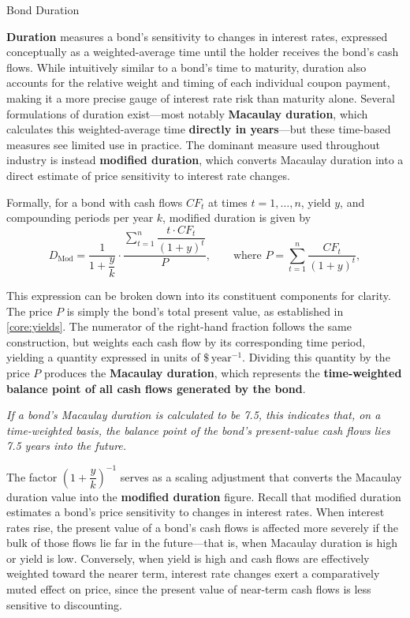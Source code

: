 \documentclass[10pt]{article}
\begin{document}
    \begin{core}[label=core:bond_duration]{Bond Duration}

      \textbf{Duration} measures a bond's sensitivity to changes in interest rates, expressed conceptually as a weighted-average time until the holder receives the bond's cash flows. While intuitively similar to a bond's time to maturity, duration also accounts for the relative weight and timing of each individual coupon payment, making it a more precise gauge of interest rate risk than maturity alone. Several formulations of duration exist---most notably \textbf{Macaulay duration}, which calculates this weighted-average time \textbf{directly in years}---but these time-based measures see limited use in practice. The dominant measure used throughout industry is instead \textbf{modified duration}, which converts Macaulay duration into a direct estimate of price sensitivity to interest rate changes.

      Formally, for a bond with cash flows $CF_t$ at times $t = 1, \dots, n$, yield $y$, and compounding periods per year $k$, modified duration is given by
      \[
        D_{\text{Mod}} = \frac{1}{1 + \dfrac{y}{k}} \cdot \frac{\displaystyle\sum_{t=1}^{n} \dfrac{t \cdot CF_t}{(1+y)^t}}{P},
        \qquad \text{where } P = \sum_{t=1}^{n} \frac{CF_t}{(1+y)^t},
      \]

      This expression can be broken down into its constituent components for clarity. The price $P$ is simply the bond's total present value, as established in \autoref{core:yields}. The numerator of the right-hand fraction follows the same construction, but weights each cash flow by its corresponding time period, yielding a quantity expressed in units of $\$\,\text{year}^{-1}$. Dividing this quantity by the price $P$ produces the \textbf{Macaulay duration}, which represents the \textbf{time-weighted balance point of all cash flows generated by the bond}.

      \textit{If a bond's Macaulay duration is calculated to be 7.5, this indicates that, on a time-weighted basis, the balance point of the bond's present-value cash flows lies 7.5 years into the future.}

      The factor $(1+\dfrac{y}{k})^{-1}$ serves as a scaling adjustment that converts the Macaulay duration value into the \textbf{modified duration} figure. Recall that modified duration estimates a bond's price sensitivity to changes in interest rates. When interest rates rise, the present value of a bond's cash flows is affected more severely if the bulk of those flows lie far in the future---that is, when Macaulay duration is high or yield is low. Conversely, when yield is high and cash flows are effectively weighted toward the nearer term, interest rate changes exert a comparatively muted effect on price, since the present value of near-term cash flows is less sensitive to discounting.


\end{core}
\end{document}
